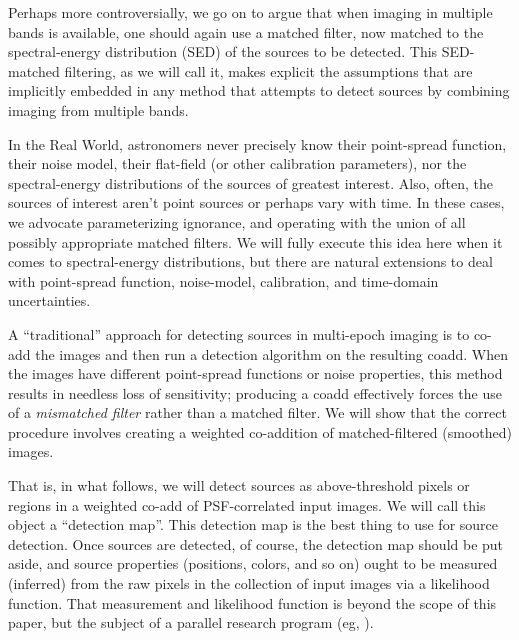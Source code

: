 \documentclass[letterpaper,preprint]{aastex62}
\begin{document}
Perhaps more controversially, we go on to argue that when imaging in
multiple bands is available, one should again use a matched filter,
now matched to the spectral-energy distribution (SED) of the sources
to be detected.  This SED-matched filtering, as we will call it, makes
explicit the assumptions that are implicitly embedded in any method
that attempts to detect sources by combining imaging from multiple
bands.

In the Real World, astronomers never precisely know their point-spread
function, their noise model, their flat-field (or other calibration
parameters), nor the spectral-energy distributions of the sources of
greatest interest.
Also, often, the sources of interest aren't point sources or perhaps
vary with time.
In these cases, we advocate parameterizing ignorance, and operating
with the union of all possibly appropriate matched filters.
We will fully execute this idea here when it comes to spectral-energy
distributions, but there are natural extensions to deal with
point-spread function, noise-model, calibration, and time-domain
uncertainties.



A ``traditional'' approach for detecting sources in multi-epoch
imaging is to co-add the images and then run a detection algorithm on
the resulting coadd.  When the images have different point-spread
functions or noise properties, this method results in needless loss of
sensitivity; producing a coadd effectively forces the use of a
\emph{mismatched filter} rather than a matched filter.  We will show
that the correct procedure involves creating a weighted co-addition of
matched-filtered (smoothed) images.



That is, in what follows, we will detect sources as above-threshold
pixels or regions in a weighted co-add of PSF-correlated input images.
We will call this object a ``detection map''.  This detection map is
the best thing to use for source detection.  Once sources are
detected, of course, the detection map should be put aside, and source
properties (positions, colors, and so on) ought to be measured
(inferred) from the raw pixels in the collection of input images via a
likelihood function.  That measurement and likelihood function is
beyond the scope of this paper, but the subject of a parallel research
program (eg, \cite{unwise-phot}).
\end{document}
